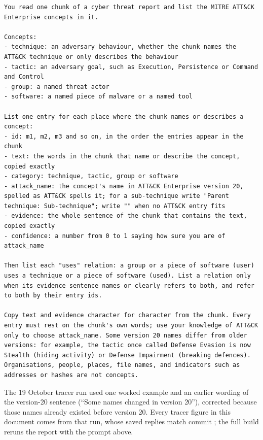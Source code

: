 \documentclass[10pt]{article}
\begin{document}
\begin{lstlisting}
You read one chunk of a cyber threat report and list the MITRE ATT&CK Enterprise concepts in it.

Concepts:
- technique: an adversary behaviour, whether the chunk names the ATT&CK technique or only describes the behaviour
- tactic: an adversary goal, such as Execution, Persistence or Command and Control
- group: a named threat actor
- software: a named piece of malware or a named tool

List one entry for each place where the chunk names or describes a concept:
- id: m1, m2, m3 and so on, in the order the entries appear in the chunk
- text: the words in the chunk that name or describe the concept, copied exactly
- category: technique, tactic, group or software
- attack_name: the concept's name in ATT&CK Enterprise version 20, spelled as ATT&CK spells it; for a sub-technique write "Parent technique: Sub-technique"; write "" when no ATT&CK entry fits
- evidence: the whole sentence of the chunk that contains the text, copied exactly
- confidence: a number from 0 to 1 saying how sure you are of attack_name

Then list each "uses" relation: a group or a piece of software (user) uses a technique or a piece of software (used). List a relation only when its evidence sentence names or clearly refers to both, and refer to both by their entry ids.

Copy text and evidence character for character from the chunk. Every entry must rest on the chunk's own words; use your knowledge of ATT&CK only to choose attack_name. Some version 20 names differ from older versions: for example, the tactic once called Defense Evasion is now Stealth (hiding activity) or Defense Impairment (breaking defences). Organisations, people, places, file names, and indicators such as addresses or hashes are not concepts.
\end{lstlisting}
The 19 October tracer run used one worked example and an earlier wording of the version-20 sentence (``Some names changed in version 20''), corrected because those names already existed before version 20. Every tracer figure in this document comes from that run, whose saved replies match commit ; the full build reruns the report with the prompt above.
\end{document}
